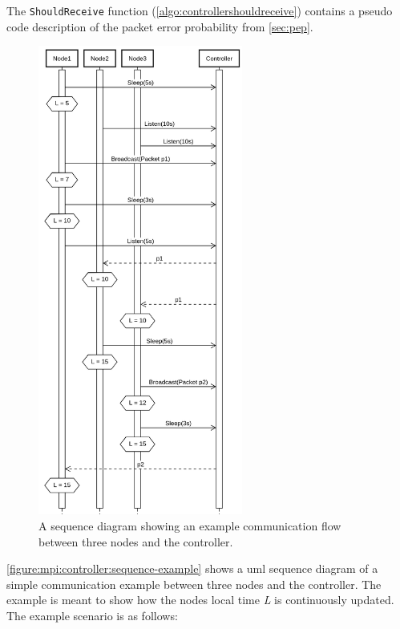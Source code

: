 The \texttt{ShouldReceive} function (\autoref{algo:controllershouldreceive}) contains a pseudo code description of the packet error probability from \autoref{sec:pep}. \medbreak

\begin{figure}[H]
    \centering
    \includegraphics[width=0.6\textwidth]{figures/controller_sequence.png}
    \caption{A sequence diagram showing an example communication flow between three nodes and the controller.}
    \label{figure:mpi:controller:sequence-example}
\end{figure}

\autoref{figure:mpi:controller:sequence-example} shows a \gls{uml} sequence diagram of a simple communication example between three nodes and the controller. The example is meant to show how the nodes local time \textit{L} is continuously updated. The example scenario is as follows:


